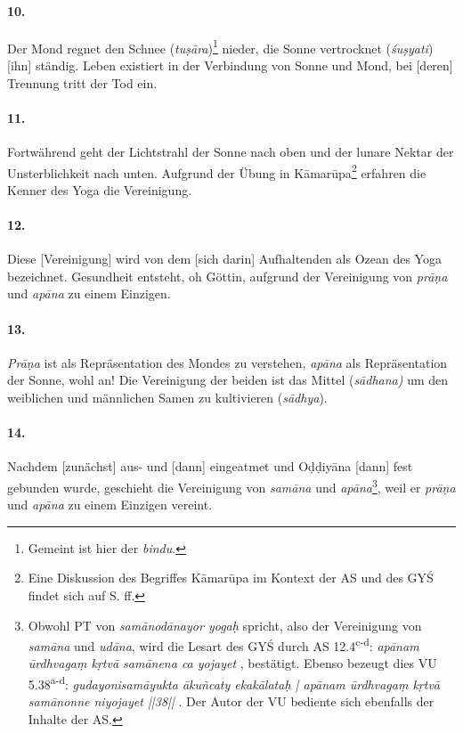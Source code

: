 \documentclass[a4paper,12pt]{article}
\begin{document}
\paragraph{10.} Der Mond regnet den Schnee (\textit{tuṣāra})\footnote{Gemeint ist hier der \textit{bindu}.} nieder, die Sonne vertrocknet (\textit{śuṣyati}) [ihn] ständig. Leben existiert in der Verbindung von Sonne und Mond, bei [deren] Trennung tritt der Tod ein. 

\paragraph{11.} Fortwährend geht der Lichtstrahl der Sonne nach oben und der lunare Nektar der Unsterblichkeit nach unten. Aufgrund der Übung in Kāmarūpa\footnote{Eine Diskussion des Begriffes Kāmarūpa im Kontext der AS und des GYŚ findet sich auf S.\pageref{kamarupa} ff.} erfahren die Kenner des Yoga die Vereinigung. 

\paragraph{12.} Diese [Vereinigung] wird von dem [sich darin] Aufhaltenden als Ozean des Yoga bezeichnet. Gesundheit entsteht, oh Göttin, aufgrund der Vereinigung von \textit{prāṇa} und \textit{apāna} zu einem Einzigen.

\paragraph{13.} \textit{Prāṇa} ist als Repräsentation des Mondes zu verstehen, \textit{apāna} als Repräsentation der Sonne, wohl an! Die Vereinigung der beiden ist das Mittel (\textit{sādhana)} um den weiblichen und männlichen Samen zu kultivieren (\textit{sādhya}). 

\paragraph{14.} Nachdem [zunächst] aus- und [dann] eingeatmet und Oḍḍiyāna [dann] fest gebunden wurde, geschieht die Vereinigung von \textit{samāna} und \textit{apāna}\footnote{Obwohl PT von \textit{samānodānayor yogaḥ} spricht, also der Vereinigung von \textit{samāna} und \textit{udāna}, wird die Lesart des GYŚ durch AS 12.4\textsuperscript{c-d}: \textit{apānam ūrdhvagaṃ kṛtvā samānena ca yojayet} \parencite[17]{asiddhi}, bestätigt. Ebenso bezeugt dies VU 5.38\textsuperscript{a-d}: \textit{gudayonisamāyukta ākuñcaty ekakālataḥ | apānam ūrdhvagaṃ kṛtvā samānonne niyojayet ||38||} \parencite[17]{varahaupanishad}. Der Autor der VU bediente sich ebenfalls der Inhalte der AS.}, weil er \textit{prāṇa} und \textit{apāna} zu einem Einzigen vereint. 
\end{document}
